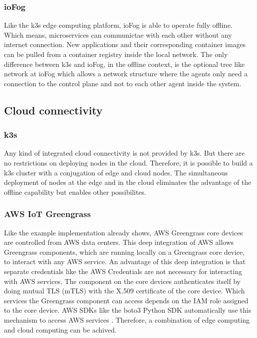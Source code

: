 \subsubsection*{ioFog}
Like the k3s edge computing platform, ioFog is able to operate fully offline. Which means, microservices can communictae with each other without any internet connection. New applications and their corresponding container images can be pulled from a container registry inside the local network. The only difference between k3s and ioFog, in the offline context, is the optional tree like network at ioFog which allows a network structure where the agents only need a connection to the control plane and not to each other agent inside the system.

\subsection*{Cloud connectivity}
\subsubsection*{k3s}
Any kind of integrated cloud connectivity is not provided by k3s. But there are no restrictions on deploying nodes in the cloud. Therefore, it is possible to build a k3s cluster with a conjugation of edge and cloud nodes. The simultaneous deployment of nodes at the edge and in the cloud eliminates the advantage of the offline capability but enables other possibilites.

\subsubsection*{AWS IoT Greengrass}
Like the example implementation already shows, AWS Greengrass core devices are controlled from \gls{AWS} data centers. This deep integration of \gls{AWS} allows Greengrass components, which are running locally on a Greengrass core device, to interact with any \gls{AWS} service. An advantage of this deep integration is that separate credentials like the AWS Credentials are not necessary for interacting with AWS services. The component on the core devices authenticates itself by doing  mutual TLS (mTLS) with the X.509 certificate of the core device. Which services the Greengrass component can access depends on the IAM role assigned to the core device. AWS SDKs like the boto3 Python SDK automatically use this mechanism to access AWS services \cite{AWSGGCInteractWithServices}. Therefore, a combination of edge computing and cloud computing can be achived.

